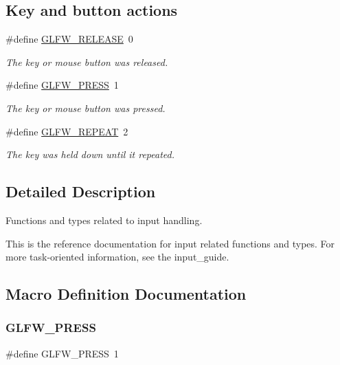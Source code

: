 \subsection*{Key and button actions}
\begin{DoxyCompactItemize}
\item 
\#define \mbox{\hyperlink{group__input_gada11d965c4da13090ad336e030e4d11f}{G\+L\+F\+W\+\_\+\+R\+E\+L\+E\+A\+SE}}~0
\begin{DoxyCompactList}\small\item\em The key or mouse button was released. \end{DoxyCompactList}\item 
\#define \mbox{\hyperlink{group__input_ga2485743d0b59df3791c45951c4195265}{G\+L\+F\+W\+\_\+\+P\+R\+E\+SS}}~1
\begin{DoxyCompactList}\small\item\em The key or mouse button was pressed. \end{DoxyCompactList}\item 
\#define \mbox{\hyperlink{group__input_gac96fd3b9fc66c6f0eebaf6532595338f}{G\+L\+F\+W\+\_\+\+R\+E\+P\+E\+AT}}~2
\begin{DoxyCompactList}\small\item\em The key was held down until it repeated. \end{DoxyCompactList}\end{DoxyCompactItemize}


\subsection{Detailed Description}
Functions and types related to input handling. 

This is the reference documentation for input related functions and types. For more task-\/oriented information, see the input\+\_\+guide. 

\subsection{Macro Definition Documentation}
\mbox{\label{group__input_ga2485743d0b59df3791c45951c4195265}} 
\subsubsection{\texorpdfstring{GLFW\_PRESS}{GLFW\_PRESS}}
{\footnotesize\ttfamily \#define G\+L\+F\+W\+\_\+\+P\+R\+E\+SS~1}




